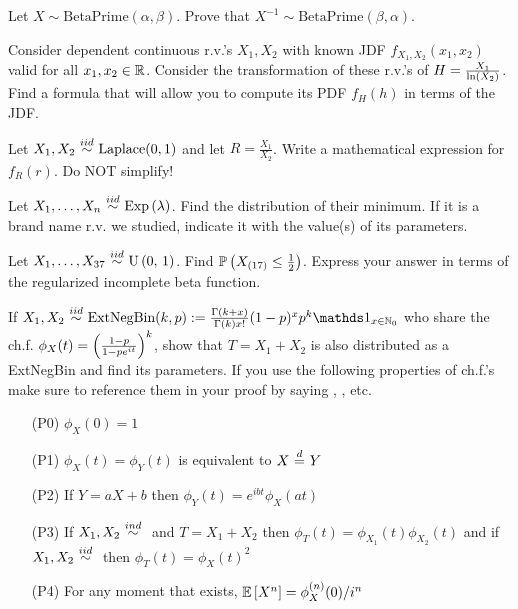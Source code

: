 \documentclass[12pt]{article}
\begin{document}
 Let $X \sim \text{BetaPrime}(\alpha, \beta)$. Prove that $X^{-1} \sim \text{BetaPrime}(\beta, \alpha)$. 




 Consider dependent continuous r.v.'s $X_1, X_2$ with known JDF $f_{X_1, X_2}(x_1, x_2)$ valid for all $x_1, x_2 \in \mathbb{R}$. Consider the transformation of these r.v.'s of $H = \frac{X_1}{\ln\left(X_2\right)}$. Find a formula that will allow you to compute its PDF $f_H(h)$ in terms of the JDF. 


 Let $X_1, X_2 \iid \text{Laplace}(0,1)$ and let $R = \frac{X_1}{X_2}$. Write a mathematical expression for $f_R(r)$. Do NOT simplify! 



 Let $\Xoneton \iid \exponential{\lambda}$. Find the distribution of their minimum. If it is a brand name r.v. we studied, indicate it with the value(s) of its parameters. 

 Let $X_1, \ldots, X_{37} \iid \stduniform$. Find $\mathbb{P}\left(X_{(17)} \leq \frac{1}{2}\right)$. Express your answer in terms of the regularized incomplete beta function. 

 If $X_1, X_2 \iid \text{ExtNegBin}(k, p) := \frac{\Gamma(k + x)}{\Gamma(k)x!} (1 - p)^x p^k \indic{x \in \naturals_0}$ who share the ch.f. $\phi_X(t) = \left(\frac{1-p}{1-pe^{it}}\right)^{k}$, show that $T = X_1 + X_2$ is also distributed as a ExtNegBin and find its parameters. If you use the following properties of ch.f.'s make sure to reference them in your proof by saying , , etc.

\footnotesize
\begin{itemize}
\item[(P0)] $\phi_X(0) = 1$
\item[(P1)] $\phi_X(t) = \phi_Y(t)$ is equivalent to $X \equalsindist Y$
\item[(P2)] If $Y = aX + b$ then $\phi_Y(t) = e^{ibt}\phi_X(at)$
\item[(P3)] If $X_1, X_2 \inddist$ and $T = X_1 + X_2$ then $\phi_T(t) = \phi_{X_1}(t) \phi_{X_2}(t)$ and if $X_1, X_2 \iid$ then $\phi_T(t) = \phi_{X}(t)^2$
\item[(P4)] For any moment that exists, $\mathbb{E}\left[X^n\right] = \phi^{(n)}_X(0) / i^n$
\end{itemize}
\normalsize~
\end{document}
